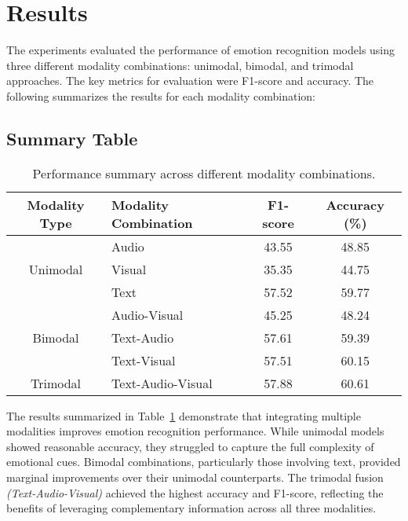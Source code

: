 \section{Results}
The experiments evaluated the performance of emotion recognition models using three different modality combinations: unimodal, bimodal, and trimodal approaches. The key metrics for evaluation were F1-score and accuracy. The following summarizes the results for each modality combination:

\subsection{Summary Table}
\begin{table}[h!]
\centering
\begin{tabular}{|c|l|c|c|}
\hline
\textbf{Modality Type} & \textbf{Modality Combination} & \textbf{F1-score} & \textbf{Accuracy (\%)} \\ \hline
\multirow{3}{*}{Unimodal} & Audio                         & 43.55             & 48.85                 \\ \cline{2-4}
                          & Visual                        & 35.35             & 44.75                 \\ \cline{2-4}
                          & Text                          & 57.52             & 59.77                 \\ \hline
\multirow{3}{*}{Bimodal}  & Audio-Visual                  & 45.25             & 48.24                 \\ \cline{2-4}
                          & Text-Audio                    & 57.61             & 59.39                 \\ \cline{2-4}
                          & Text-Visual                   & 57.51             & 60.15                 \\ \hline
Trimodal                  & Text-Audio-Visual             & 57.88             & 60.61                 \\ \hline
\end{tabular}
\caption{Performance summary across different modality combinations.}
\label{tab:results}
\end{table}

The results summarized in Table~\ref{tab:results} demonstrate that integrating multiple modalities improves emotion recognition performance. While unimodal models showed reasonable accuracy, they struggled to capture the full complexity of emotional cues. Bimodal combinations, particularly those involving text, provided marginal improvements over their unimodal counterparts. The trimodal fusion \emph{(Text-Audio-Visual)} achieved the highest accuracy and F1-score, reflecting the benefits of leveraging complementary information across all three modalities.

